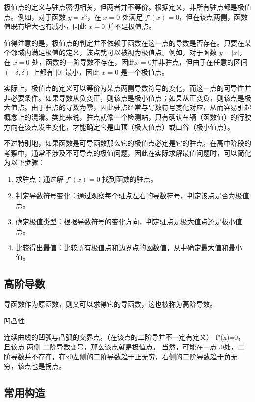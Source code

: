 极值点的定义与驻点密切相关，但两者并不等价。根据定义，非所有驻点都是极值点。例如，对于函数 $y = x^3$，在 $x = 0$ 处满足 $f'(x) = 0$，但在该点两侧，函数值既有增大也有减小，因此 $x = 0$ 并不是极值点。

值得注意的是，极值点的判定并不依赖于函数在这一点的导数是否存在。只要在某个邻域内满足极值的定义，该点就可以被视为极值点。例如，对于函数 $y = |x|$，在 $x = 0$ 处，函数的一阶导数不存在，因此$x = 0$并非驻点，但由于在任意的区间 $(-\delta, \delta)$ 上都有 $|0|$ 最小，因此 $x = 0$ 是一个极值点。

实际上，极值点的定义可以等价为某点两侧导数符号的变化，而这一点的可导性并非必要条件。如果导数从负变正，则该点是极小值点；如果从正变负，则该点是极大值点。由于驻点的导数为零，因此驻点经常与导数符号变化对应，从而容易引起概念上的混淆。类比来说，驻点就像一个检测站，只有确认车辆（函数值）的行驶方向在该点发生变化，才能确定它是山顶（极大值点）或山谷（极小值点）。

不过特别地，如果函数是可导函数那么它的极值点必定是它的驻点。在高中阶段的考察中，通常不涉及不可导点的极值问题，因此在实际求解最值问题时，可以简化为以下步骤：
\begin{enumerate}
\item 求驻点：通过解 $f'(x) = 0$ 找到函数的驻点。
\item 判定导数符号变化：通过观察每个驻点左右的导数符号，判定该点是否为极值点。
\item 确定极值类型：根据导数符号的变化方向，判定驻点是极大值点还是极小值点。
\item 比较得出最值：比较所有极值点和边界点的函数值，从中确定最大值和最小值。
\end{enumerate}


\subsection{高阶导数}

导函数作为原函数，则又可以求得它的导函数，这也被称为高阶导数。

凹凸性

连续曲线的凹弧与凸弧的交界点。（在该点的二阶导并不一定有定义）
f"(x)=0，且该点 两侧 二阶导数变号，那么该点就是极值点。
当然，可能在一点x0处，二阶导数并不存在，在x0左侧的二阶导数趋于正无穷，右侧的二阶导数趋于负无穷，该点也是拐点。

\subsection{常用构造}


